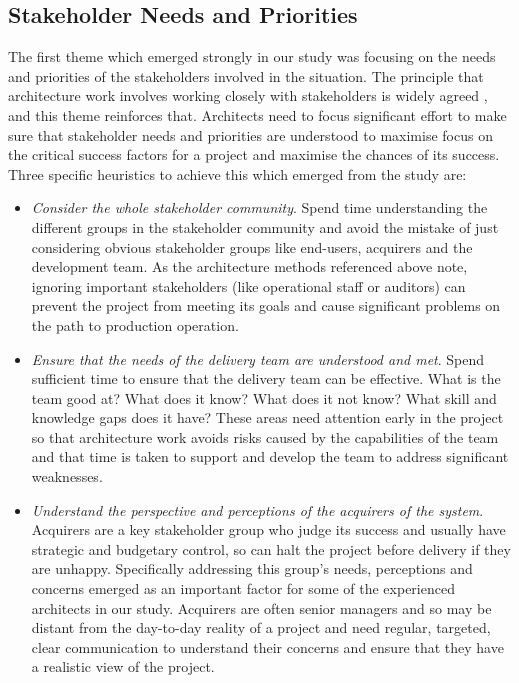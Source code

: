 \subsection{Stakeholder Needs and Priorities}

The first theme which emerged strongly in our study was focusing on the needs and priorities of the stakeholders involved in the situation.  The principle that architecture work involves working closely with stakeholders is widely agreed \cite{rozanski2011-ssa2e, bass2012-sainp}, and this theme reinforces that. Architects need to focus significant effort to make sure that stakeholder needs and priorities are understood to maximise focus on the critical success factors for a project and maximise the chances of its success.  Three specific heuristics to achieve this which emerged from the study are:

\begin{itemize}
	\item \emph{Consider the whole stakeholder community}. Spend time understanding the different groups in the stakeholder community and avoid the mistake of just considering obvious stakeholder groups like end-users, acquirers and the development team.  As the architecture methods referenced above note, ignoring important stakeholders (like operational staff or auditors) can prevent the project from meeting its goals and cause significant problems on the path to production operation.
	\item \emph{Ensure that the needs of the delivery team are understood and met}.  Spend sufficient time to ensure that the delivery team can be effective.  What is the team good at?  What does it know?  What does it not know?  What skill and knowledge gaps does it have?  These areas need attention early in the project so that architecture work avoids risks caused by the capabilities of the team and that time is taken to support and develop the team to address significant weaknesses.
	\item \emph{Understand the perspective and perceptions of the acquirers of the system}.  Acquirers are a key stakeholder group who judge its success and usually have strategic and budgetary control, so can halt the project before delivery if they are unhappy.  Specifically addressing this group's needs, perceptions and concerns emerged as an important factor for some of the experienced architects in our study.  Acquirers are often senior managers and so may be distant from the day-to-day reality of a project and need regular, targeted, clear communication to understand their concerns and ensure that they have a realistic view of the project. 
\end{itemize}

